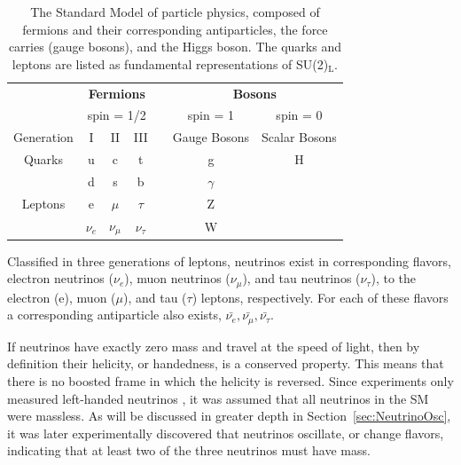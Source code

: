 
\begin{table}
	\centering
\begin{tabular}{|c|c|c|c|c|c|c|}
	\hline 
	& \multicolumn{3}{c|}{\textbf{Fermions}} & & \multicolumn{2}{c|}{\textbf{Bosons}}  \\ 
	& \multicolumn{3}{c|}{spin = 1/2} & & spin = 1 & spin = 0 \\
	\hline 
	Generation & I & II & III & & Gauge Bosons & Scalar Bosons \\ 
	\hline 
	Quarks & u & c & t & & g & H \\ 
	& d & s & b & & $\gamma$ &  \\ 
	Leptons & e & $\mu$ & $\tau$ & &  Z &  \\ 
	& $\nu_{e}$ & $\nu_{\mu}$ & $\nu_{\tau}$ & & W &  \\ 
	\hline 
\end{tabular}
\caption{The Standard Model of particle physics, composed of fermions and their corresponding antiparticles, the force carries (gauge bosons), and the Higgs boson. The quarks and leptons are listed as fundamental representations of SU(2)$_\textrm{L}$.}
\label{tab:SM}
\end{table}

Classified in three generations of leptons, neutrinos exist in corresponding flavors, electron neutrinos ($\nu_{e}$), muon neutrinos ($\nu_{\mu}$), and tau neutrinos ($\nu_{\tau}$), to the electron (e), muon ($\mu$), and tau ($\tau$) leptons, respectively.
For each of these flavors a corresponding antiparticle also exists, $\bar{\nu_e}, \bar{\nu_\mu}, \bar{\nu_\tau}$.

If neutrinos have exactly zero mass and travel at the speed of light, then by definition their helicity, or handedness, is a conserved property. 
This means that there is no boosted frame in which the helicity is reversed.
Since experiments only measured left-handed neutrinos \cite{PhysRev.109.1015}, it was assumed that all neutrinos in the SM were massless.
As will be discussed in greater depth in Section~\ref{sec:NeutrinoOsc}, it was later experimentally discovered that neutrinos oscillate, or change flavors, indicating that at least two of the three neutrinos must have mass.

